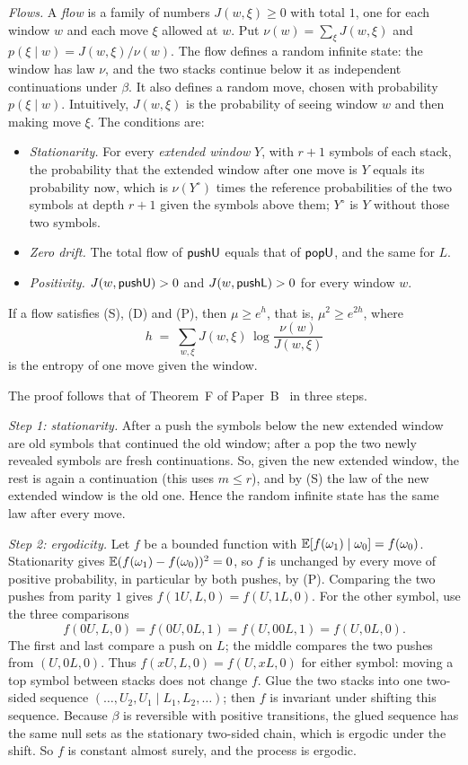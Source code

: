 \emph{Flows.} A \emph{flow} is a family of numbers $J(w,\xi)\ge0$ with total $1$, one for each window $w$ and each move
$\xi$ allowed at $w$. Put $\nu(w)=\sum_\xi J(w,\xi)$ and $p(\xi\mid w)=J(w,\xi)/\nu(w)$. The flow defines a random
infinite state: the window has law $\nu$, and the two stacks continue below it as independent continuations under
$\beta$. It also defines a random move, chosen with probability $p(\xi\mid w)$. Intuitively, $J(w,\xi)$ is the
probability of seeing window $w$ and then making move $\xi$. The conditions are:
\begin{itemize}
\item[(S)] \emph{Stationarity.} For every \emph{extended window} $Y$, with $r+1$ symbols of each stack, the
probability that the extended window after one move is $Y$ equals its probability now, which is $\nu(Y^\circ)$ times
the reference probabilities of the two symbols at depth $r+1$ given the symbols above them; $Y^\circ$ is $Y$ without
those two symbols.
\item[(D)] \emph{Zero drift.} The total flow of $\mathsf{pushU}$ equals that of $\mathsf{popU}$, and the same for $L$.
\item[(P)] \emph{Positivity.} $J(w,\mathsf{pushU})>0$ and $J(w,\mathsf{pushL})>0$ for every window $w$.
\end{itemize}

\begin{theoremL}
If a flow satisfies (S), (D) and (P), then $\mu\ge e^{h}$, that is, $\mu^2\ge e^{2h}$, where
\[ h\;=\;\sum_{w,\xi}J(w,\xi)\,\log\frac{\nu(w)}{J(w,\xi)} \]
is the entropy of one move given the window.
\end{theoremL}

The proof follows that of Theorem~F of Paper~B~\cite{PaperB} in three steps.

\emph{Step 1: stationarity.} After a push the symbols below the new extended window are old symbols that continued
the old window; after a pop the two newly revealed symbols are fresh continuations. So, given the new extended
window, the rest is again a continuation (this uses $m\le r$), and by (S) the law of the new extended window is the
old one. Hence the random infinite state has the same law after every move.

\emph{Step 2: ergodicity.} Let $f$ be a bounded function with $\mathbb{E}[f(\omega_1)\mid\omega_0]=f(\omega_0)$. Stationarity gives
$\mathbb{E}(f(\omega_1)-f(\omega_0))^2=0$, so $f$ is unchanged by every move of positive probability, in particular by both
pushes, by (P). Comparing the two pushes from parity $1$ gives $f(1U,L,0)=f(U,1L,0)$.
For the other symbol, use the three comparisons
\[ f(0U,L,0)=f(0U,0L,1)=f(U,00L,1)=f(U,0L,0). \]
The first and last compare a push on $L$; the middle compares the two pushes from $(U,0L,0)$.
Thus $f(xU,L,0)=f(U,xL,0)$ for either symbol: moving a top symbol between stacks does not change $f$. Glue the two stacks into one two-sided sequence
$(\ldots,U_2,U_1\mid L_1,L_2,\ldots)$; then $f$ is invariant under shifting this sequence. Because $\beta$ is
reversible with positive transitions, the glued sequence has the same null sets as the stationary two-sided chain,
which is ergodic under the shift. So $f$ is constant almost surely, and the process is ergodic.


